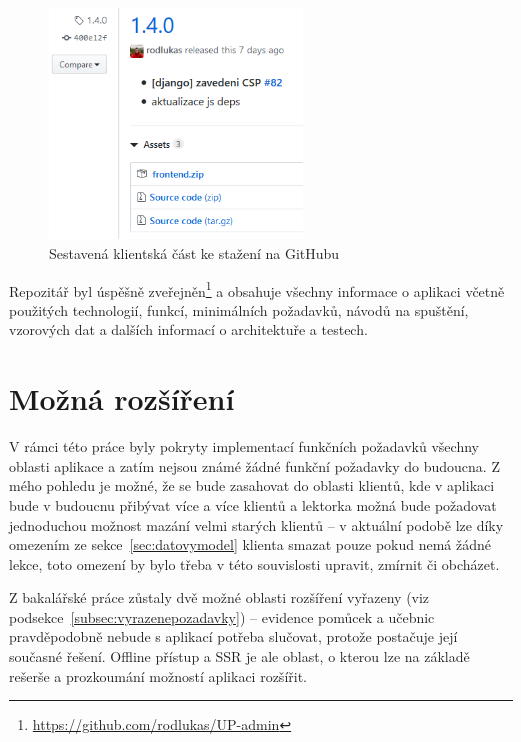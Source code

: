 \begin{figure}[h]\centering
    \includegraphics[width=0.6\textwidth]{img/gh.png}
    \caption{Sestavená klientská část ke stažení na GitHubu}\label{fig:gh}
\end{figure}

Repozitář byl úspěšně zveřejněn\footnote{\url{https://github.com/rodlukas/UP-admin}} a obsahuje všechny informace o aplikaci včetně použitých technologií, funkcí, minimálních požadavků, návodů na spuštění, vzorových dat a dalších informací o architektuře a testech.

\chapter{Možná rozšíření}

V rámci této práce byly pokryty implementací funkčních požadavků všechny oblasti aplikace a zatím nejsou známé žádné funkční požadavky do budoucna. Z mého pohledu je možné, že se bude zasahovat do oblasti klientů, kde v aplikaci bude v budoucnu přibývat více a více klientů a lektorka možná bude požadovat jednoduchou možnost mazání velmi starých klientů -- v aktuální podobě lze díky omezením ze sekce~\ref{sec:datovymodel} klienta smazat pouze pokud nemá žádné lekce, toto omezení by bylo třeba v této souvislosti upravit, zmírnit či obcházet.

Z bakalářské práce zůstaly dvě možné oblasti rozšíření vyřazeny (viz podsekce~\ref{subsec:vyrazenepozadavky}) -- evidence pomůcek a učebnic pravděpodobně nebude s aplikací potřeba slučovat, protože postačuje její současné řešení. Offline přístup a SSR je ale oblast, o kterou lze na základě rešerše a prozkoumání možností aplikaci rozšířit.

